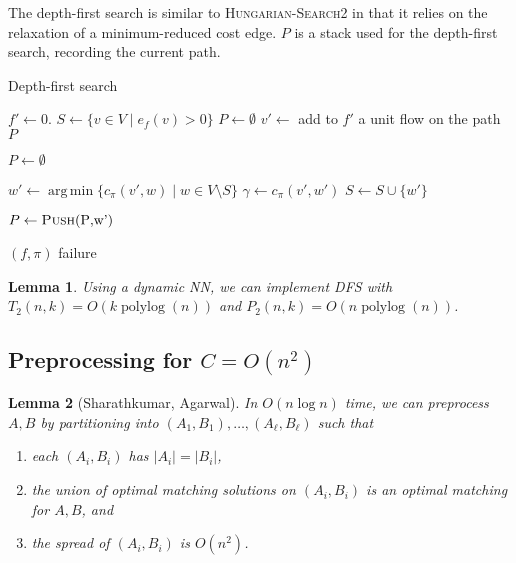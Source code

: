 \documentclass[11pt]{article}
\def\polylog{\mathop{\mathrm{polylog}}}
\DeclareMathOperator*{\argmin}{arg\,min}
\theoremstyle{plain}
\newtheorem{lemma}{Lemma}
\begin{document}
The depth-first search is similar to \textsc{Hungarian-Search2} in that it 
relies on the relaxation of a minimum-reduced cost edge.
$P$ is a stack used for the depth-first search, recording the current path.
\begin{algorithm}
\caption{Depth-first search}
\begin{algorithmic}[1]
	\State $f' \gets 0$.
	\State $S \gets \{v \in V \mid e_f(v) > 0\}$
	\State $P \gets \emptyset$
	\Repeat
		\State $v' \gets$ 
			\State add to $f'$ a unit flow on the path $P$
			
			\State $P \gets \emptyset$
		\EndIf

		\Statex %
		\State $w' \gets \argmin\{c_\pi(v', w) \mid w \in V \setminus S\}$
		\State $\gamma \gets c_\pi(v', w')$
		\Statex %
			\State $S \gets S \cup \{w'\}$
			
			\State $P \gets \Call{Push}{$P$, $w'$}$

		\EndIf




		 
			\State\Return $(f, \pi)$
		\EndIf
	\State\Return failure
\EndFunction
\end{algorithmic}
\end{algorithm}


\begin{lemma}
\label{lemma:goldberg_dfs_time}
	Using a dynamic NN, we can implement \textsc{DFS} with 
	$T_2(n, k) = O(k\polylog(n))$ and $P_2(n, k) = O(n\polylog(n))$.
\end{lemma}








\subsection{Preprocessing for $C = O(n^2)$}

\begin{lemma}[Sharathkumar, Agarwal]
	In $O(n\log n)$ time, we can preprocess $A, B$ by partitioning into
	$(A_1, B_1), \ldots, (A_\ell, B_\ell)$ such that 
	\begin{enumerate}
	\item each $(A_i, B_i)$ has $|A_i| = |B_i|$,
	\item the union of optimal matching solutions on $(A_i, B_i)$
		is an optimal matching for $A, B$, and
	\item the spread of $(A_i, B_i)$ is $O(n^2)$.
	\end{enumerate}
\end{lemma}















{


}
\end{document}
